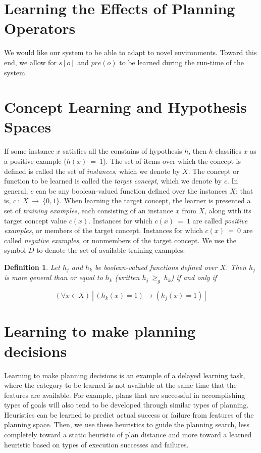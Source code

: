 \documentclass[twoside,letterpaper,11pt]{article}
\newtheorem{mydef}{Definition}
\begin{document}
\section{Learning the Effects of Planning Operators}

We would like our system to be able to adapt to novel environments.
Toward this end, we allow for $s[o]$ and $pre(o)$ to be learned during the run-time of the system.

\section{Concept Learning and Hypothesis Spaces}

If some instance $x$ satisfies all the constains of hypothesis $h$, then $h$ classifies $x$ as a positive example ($h(x)~=~1$).
The set of items over which the concept is defined is called the set of \emph{instances}, which we denote by $X$.
The concept or function to be learned is called the \emph{target concept}, which we denote by $c$.
In general, $c$ can be any boolean-valued function defined over the instances $X$; that is, $c~:~X~\rightarrow~\{0,1\}$.
When learning the target concept, the learner is presented a set of \emph{training examples}, each consisting of an instance $x$ from $X$, along with its target concept value $c(x)$.
Instances for which $c(x)~=~1$ are called \emph{positive examples}, or members of the target concept.
Instances for which $c(x)~=~0$ are called \emph{negative examples}, or nonmembers of the target concept.
We use the symbol $D$ to denote the set of available training examples.


\begin{mydef}
Let $h_j$ and $h_k$ be boolean-valued functions defined over $X$.
Then $h_j$ is \emph{more general than or equal to} $h_k$ (written $h_j~{\geq}_g~h_k$) if and only if

\begin{equation}
({\forall}x \in X)[(h_k(x) = 1) \rightarrow (h_j(x) = 1)]
\end{equation}

\end{mydef}


\section{Learning to make planning decisions}

Learning to make planning decisions is an example of a delayed
learning task, where the category to be learned is not available at
the same time that the features are available.  For example, plans
that are successful in accomplishing types of goals will also tend to
be developed through similar types of planning.  Heuristics can be
learned to predict actual success or failure from features of the
planning space.  Then, we use these heuristics to guide the planning
search, less completely toward a static heuristic of plan distance and
more toward a learned heuristic based on types of execution successes
and failures.
\end{document}
